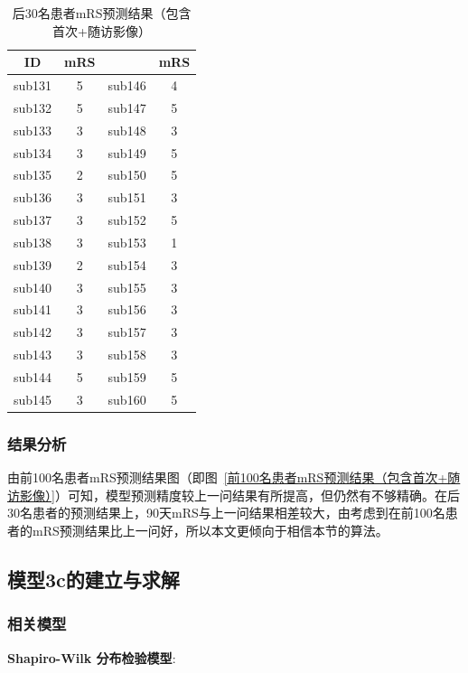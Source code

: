 \documentclass[bwprint]{gmcmthesis}
\begin{document}
\begin{table}[ht]
\caption{后30名患者mRS预测结果（包含首次+随访影像）}
\label{后30名患者mRS预测结果（包含首次+随访影像）}
\centering
\begin{tabular}{cccc}
     \hline
        ID & mRS & ~ & mRS \\ \hline
        sub131 & 5 & sub146 & 4 \\ 
        sub132 & 5 & sub147 & 5 \\ 
        sub133 & 3 & sub148 & 3 \\ 
        sub134 & 3 & sub149 & 5 \\ 
        sub135 & 2 & sub150 & 5 \\ 
        sub136 & 3 & sub151 & 3 \\ 
        sub137 & 3 & sub152 & 5 \\ 
        sub138 & 3 & sub153 & 1 \\ 
        sub139 & 2 & sub154 & 3 \\ 
        sub140 & 3 & sub155 & 3 \\ 
        sub141 & 3 & sub156 & 3 \\ 
        sub142 & 3 & sub157 & 3 \\ 
        sub143 & 3 & sub158 & 3 \\ 
        sub144 & 5 & sub159 & 5 \\ 
        sub145 & 3 & sub160 & 5 \\ \hline
    \end{tabular}
\end{table}

\subsubsection{结果分析}

由前100名患者mRS预测结果图（即图~\ref{前100名患者mRS预测结果（包含首次+随访影像）}）可知，模型预测精度较上一问结果有所提高，但仍然有不够精确。在后30名患者的预测结果上，90天mRS与上一问结果相差较大，由考虑到在前100名患者的mRS预测结果比上一问好，所以本文更倾向于相信本节的算法。

\subsection{模型3c的建立与求解}
\subsubsection{相关模型}

\textbf{Shapiro-Wilk 分布检验模型}:
\end{document}
